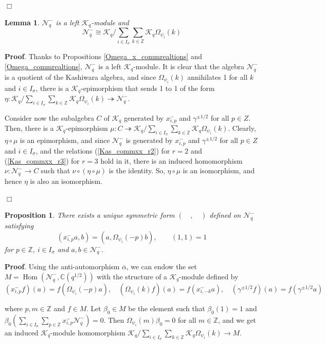 \documentclass[12pt]{amsart}
\newtheorem{lem}[thm]{Lemma}
\newtheorem{prop}[thm]{Proposition}
\numberwithin{equation}{section}
\newcommand{\dem }{\noindent\textbf{Proof}. }
\newcommand{\findem }{\hfill $\Box$ \vskip0.5cm }
\newcommand{\Z}{\ensuremath{\mathbb{Z}}}
\newcommand{\C}{\ensuremath{\mathbb{C}}}
\newcommand{\Hom}{\operatorname{Hom}}
\newcommand{\mc}[1]{\mathcal{#1}}
\begin{document}
\findem

\begin{lem}
    $\mc{N}_q^-$ is a left $\mc{K}_q$-module and $$ \mc{N}_q^- \cong \mc{K}_q/ \sum_{i\in I_\sigma}\sum_{k\in \Z} \mc{K}_q\Omega_{\psi_i}(k) $$
\end{lem}

\dem Thanks to Propositions \ref{Omega_x_commrealtions} and \ref{Omega_commrealtions}, $\mc{N}_q^-$ is a left $\mc{K}_q$-module. It is clear that the algebra $\mc{N}_q^-$ is a quotient of the Kashiwara algebra, and since $\Omega_{\psi_i}(k)$ annihilates 1 for all $k$ and $i\in I_\sigma$, there is a $\mc{K}_q$-epimorphism that sends 1 to 1 of the form $  \displaystyle \eta: \mc{K}_q/ \sum_{i\in I_\sigma}\sum_{k\in \Z} \mc{K}_q\Omega_{\psi_i}(k) \twoheadrightarrow \mc{N}_q^-$.

Consider now the subalgebra $C$ of $\mc{K}_q$ generated by $x^-_{i,p}
$ and $\gamma^{\pm 1/2}$ for all $p\in Z$. Then, there is a $\mc{K}_q$-epimorphism $\displaystyle \mu : C \twoheadrightarrow \mc{K}_q/ \sum_{i\in I_\sigma}\sum_{k\in \Z} \mc{K}_q\Omega_{\psi_i}(k)$. Clearly, $\eta \circ \mu$ is an epimorphism, and since $\mc{N}_q^-$ is generated by $x^-_{i,p}$ and $\gamma^{\pm 1/2}$ for all $p\in Z$ and $i\in I_\sigma$, and the relations (\ref{Kas_commxx_r2}) for $r=2$ and (\ref{Kas_commxx_r3}) for $r=3$ hold in it, there is an induced homomorphism $\nu : \mc{N}_q^- \to C$ such that $\nu\circ(\eta\circ\mu)$ is the identity. So, $\eta \circ\mu$ is an isomorphism, and hence $\eta$ is also an isomorphism.

\findem

\begin{prop}\label{Form_on_Nq}
    There exists a unique symmetric form $(\quad , \quad)$ defined on $\mc{N}_q^-$ satisfying $$ (x^-_{i,p}a,b) = (a,\Omega_{\psi_i}(-p)b), \quad \quad (1,1)=1 $$
    for $p\in \Z$, $i\in I_\sigma$ and $a,b\in \mc{N}_q^-$.
\end{prop}

\dem Using the anti-automorphism $\overline{\alpha}$, we can endow the set $M= \Hom(\mc{N}_q^-, \C(q^{1/2}))$ with the structure of a $\mc{K}_q$-module defined by 
$$ (x^-_{i,p}f)(a) = f(\Omega_{\psi_i}(-p)a), \quad (\Omega_{\psi_i}(k)f)(a) = f(x^-_{i,-k}a), \quad (\gamma^{\pm 1/2}f)(a) = f(\gamma^{\pm 1/2}a)  $$

where $p,m\in \Z$ and $f\in M$. Let $\beta_0\in M$ be the element such that $\beta_0(1) = 1$ and $\displaystyle \beta_0\left(\sum_{i\in I_\sigma}\sum_{p\in \Z} x_{i,p}^-\mc{N}_q^-\right)=0$. Then $\Omega_{\psi_i}(m)\beta_0 = 0$ for all $m\in \Z$, and we get an induced $\mc{K}_q$-module homomorphism $\displaystyle \mc{K}_q/ \sum_{i\in I_\sigma}\sum_{k\in \Z} \mc{K}_q\Omega_{\psi_i}(k) \to M$.\\
\end{document}
